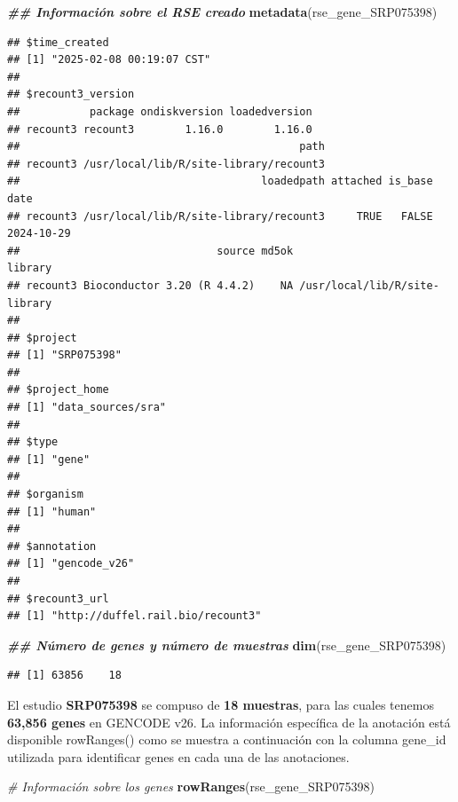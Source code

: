 \documentclass[
]{article}
\newenvironment{Shaded}{\begin{snugshade}}{\end{snugshade}}
\newcommand{\CommentTok}[1]{\textcolor[rgb]{0.56,0.35,0.01}{\textit{#1}}}
\newcommand{\DocumentationTok}[1]{\textcolor[rgb]{0.56,0.35,0.01}{\textbf{\textit{#1}}}}
\newcommand{\FunctionTok}[1]{\textcolor[rgb]{0.13,0.29,0.53}{\textbf{#1}}}
\newcommand{\NormalTok}[1]{#1}
\begin{document}
\begin{Shaded}
\begin{Highlighting}[]
\DocumentationTok{\#\# Información sobre el RSE creado}
\FunctionTok{metadata}\NormalTok{(rse\_gene\_SRP075398)}
\end{Highlighting}
\end{Shaded}

\begin{verbatim}
## $time_created
## [1] "2025-02-08 00:19:07 CST"
## 
## $recount3_version
##           package ondiskversion loadedversion
## recount3 recount3        1.16.0        1.16.0
##                                            path
## recount3 /usr/local/lib/R/site-library/recount3
##                                      loadedpath attached is_base       date
## recount3 /usr/local/lib/R/site-library/recount3     TRUE   FALSE 2024-10-29
##                               source md5ok                       library
## recount3 Bioconductor 3.20 (R 4.4.2)    NA /usr/local/lib/R/site-library
## 
## $project
## [1] "SRP075398"
## 
## $project_home
## [1] "data_sources/sra"
## 
## $type
## [1] "gene"
## 
## $organism
## [1] "human"
## 
## $annotation
## [1] "gencode_v26"
## 
## $recount3_url
## [1] "http://duffel.rail.bio/recount3"
\end{verbatim}

\begin{Shaded}
\begin{Highlighting}[]
\DocumentationTok{\#\# Número de genes y número de muestras}
\FunctionTok{dim}\NormalTok{(rse\_gene\_SRP075398)}
\end{Highlighting}
\end{Shaded}

\begin{verbatim}
## [1] 63856    18
\end{verbatim}

El estudio \textbf{SRP075398} se compuso de \textbf{18 muestras}, para
las cuales tenemos \textbf{63,856 genes} en GENCODE v26. La información
específica de la anotación está disponible rowRanges() como se muestra a
continuación con la columna gene\_id utilizada para identificar genes en
cada una de las anotaciones.

\begin{Shaded}
\begin{Highlighting}[]
\CommentTok{\# Información sobre los genes}
\FunctionTok{rowRanges}\NormalTok{(rse\_gene\_SRP075398)}
\end{Highlighting}
\end{Shaded}
\end{document}
